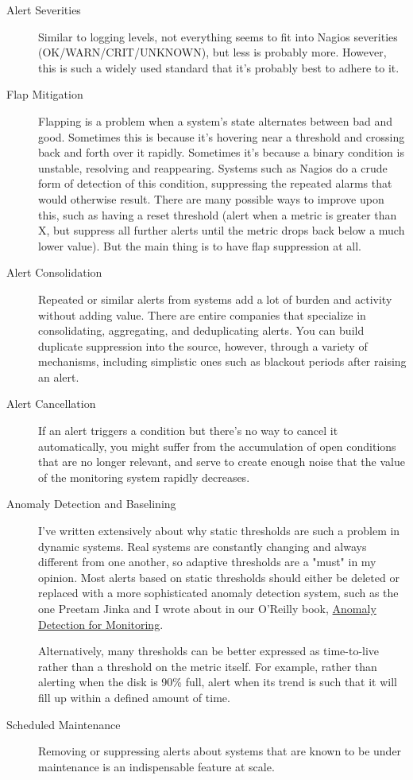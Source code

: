 \documentclass{vivid_layout}
\begin{document}
\begin{description}

\item[Alert Severities] Similar to logging levels, not everything seems to fit
into Nagios severities (OK/WARN/CRIT/UNKNOWN), but less is probably more.
However, this is such a widely used standard that it's probably best to adhere
to it.

\item[Flap Mitigation] Flapping is a problem when a system's state alternates
between bad and good. Sometimes this is because it's hovering near a threshold
and crossing back and forth over it rapidly. Sometimes it's because a binary
condition is unstable, resolving and reappearing. Systems such as Nagios do a
crude form of detection of this condition, suppressing the repeated alarms that
would otherwise result. There are many possible ways to improve upon this, such
as having a reset threshold (alert when a metric is greater than X, but suppress
all further alerts until the metric drops back below a much lower value). But
the main thing is to have flap suppression at all.

\item[Alert Consolidation] Repeated or similar alerts from systems add a lot of burden
and activity without adding value. There are entire companies that specialize in
consolidating, aggregating, and deduplicating alerts. You can build duplicate
suppression into the source, however, through a variety
of mechanisms, including simplistic ones such as blackout periods after raising an
alert.

\item[Alert Cancellation] If an alert triggers a condition but there's no way to
cancel it automatically, you might suffer from the accumulation of
open conditions that are no longer relevant, and serve to create enough noise
that the value of the monitoring system rapidly decreases.

\item[Anomaly Detection and Baselining] I've written extensively about why static thresholds
are such a problem in dynamic systems. Real systems are constantly
changing and always different from one another, so adaptive thresholds are a
"must" in my opinion. Most alerts based on static thresholds should either be
deleted or replaced with a more sophisticated anomaly detection system, such as
the one Preetam Jinka and I wrote about in our O'Reilly book,
\href{https://www.vividcortex.com/blog/anomaly-detection-for-monitoring-a-new-ebook-in-collaboration-with-oreilly-and-ruxit}{Anomaly
Detection for Monitoring}.

Alternatively, many thresholds can be better expressed as time-to-live rather
than a threshold on the metric itself. For example, rather than alerting when
the disk is 90\% full, alert when its trend is such that it will fill up within
a defined amount of time.

\item[Scheduled Maintenance] Removing or suppressing alerts about systems that
are known to be under maintenance is an indispensable feature at scale.

\end{description}
\end{document}
